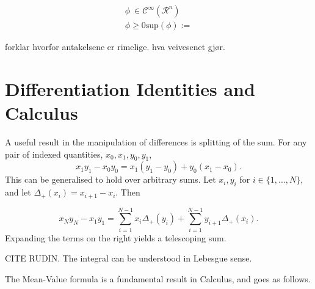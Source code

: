 \begin{align}
\phi \ \in \mathscr{C}^{\infty}(\mathscr{R}^n) \\
\phi \geq 0 
\text{sup}(\phi) := 
\end{align}

forklar hvorfor antakelsene er rimelige. hva veivesenet gjør.

\section{Differentiation Identities and Calculus}
A useful result in the manipulation of differences is splitting of the sum. For any pair of indexed quantities, $x_0, x_1,y_0, y_1$, 
\begin{equation} \label{disc_diff_part}
    x_1y_1 - x_0 y_0 = x_1 \left(y_1 - y_0\right) + y_0 \left(x_1 - x_0\right).
\end{equation}
This can be generalised to hold over arbitrary sums. Let $x_i, y_i$ for $i \in \{1,...,N\}$, and let $\Delta_+(x_i) = x_{i+1} - x_i$. Then 

\begin{equation} \label{discreteDiffPart}
    x_{N}y_{N} - x_{1}y_{1} = \sum_{i = 1}^{N-1} x_i \Delta_+(y_i) + \sum_{i = 1}^{N-1} y_{i+1}\Delta_+(x_i).
\end{equation}
Expanding the terms on the right yields a telescoping sum. 

 CITE RUDIN.  The integral can be understood in Lebesgue sense. 

The Mean-Value formula is a fundamental result in Calculus, and goes as follows. 

